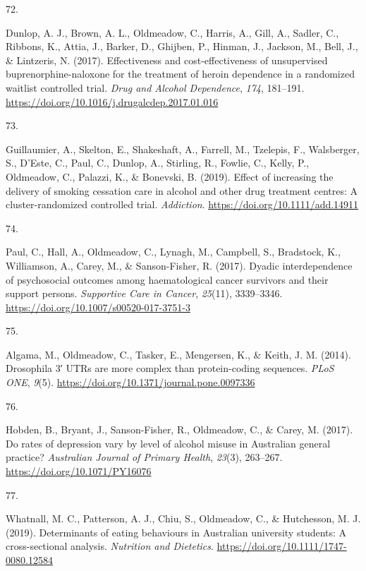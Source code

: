 \documentclass[11pt, a4paper]{awesome-cv}
\newlength{\csllabelwidth}
\newcommand{\CSLLeftMargin}[1]{\parbox[t]{\csllabelwidth}{#1}}
\newcommand{\CSLRightInline}[1]{\parbox[t]{\linewidth - \csllabelwidth}{#1}}
\begin{document}
\leavevmode\hypertarget{ref-dunlop_effectiveness_2017}{}%
\CSLLeftMargin{72. }
\CSLRightInline{Dunlop, A. J., Brown, A. L., Oldmeadow, C., Harris, A.,
Gill, A., Sadler, C., Ribbons, K., Attia, J., Barker, D., Ghijben, P.,
Hinman, J., Jackson, M., Bell, J., \& Lintzeris, N. (2017).
Effectiveness and cost-effectiveness of unsupervised
buprenorphine-naloxone for the treatment of heroin dependence in a
randomized waitlist controlled trial. \emph{Drug and Alcohol
Dependence}, \emph{174}, 181--191.
\url{https://doi.org/10.1016/j.drugalcdep.2017.01.016}}

\leavevmode\hypertarget{ref-guillaumier_effect_2019}{}%
\CSLLeftMargin{73. }
\CSLRightInline{Guillaumier, A., Skelton, E., Shakeshaft, A., Farrell,
M., Tzelepis, F., Walsberger, S., D'Este, C., Paul, C., Dunlop, A.,
Stirling, R., Fowlie, C., Kelly, P., Oldmeadow, C., Palazzi, K., \&
Bonevski, B. (2019). Effect of increasing the delivery of smoking
cessation care in alcohol and other drug treatment centres: A
cluster-randomized controlled trial. \emph{Addiction}.
\url{https://doi.org/10.1111/add.14911}}

\leavevmode\hypertarget{ref-paul_dyadic_2017}{}%
\CSLLeftMargin{74. }
\CSLRightInline{Paul, C., Hall, A., Oldmeadow, C., Lynagh, M., Campbell,
S., Bradstock, K., Williamson, A., Carey, M., \& Sanson-Fisher, R.
(2017). Dyadic interdependence of psychosocial outcomes among
haematological cancer survivors and their support persons.
\emph{Supportive Care in Cancer}, \emph{25}(11), 3339--3346.
\url{https://doi.org/10.1007/s00520-017-3751-3}}

\leavevmode\hypertarget{ref-algama_drosophila_2014}{}%
\CSLLeftMargin{75. }
\CSLRightInline{Algama, M., Oldmeadow, C., Tasker, E., Mengersen, K., \&
Keith, J. M. (2014). Drosophila 3′ UTRs are more complex than
protein-coding sequences. \emph{PLoS ONE}, \emph{9}(5).
\url{https://doi.org/10.1371/journal.pone.0097336}}

\leavevmode\hypertarget{ref-hobden_rates_2017}{}%
\CSLLeftMargin{76. }
\CSLRightInline{Hobden, B., Bryant, J., Sanson-Fisher, R., Oldmeadow,
C., \& Carey, M. (2017). Do rates of depression vary by level of alcohol
misuse in Australian general practice? \emph{Australian Journal of
Primary Health}, \emph{23}(3), 263--267.
\url{https://doi.org/10.1071/PY16076}}

\leavevmode\hypertarget{ref-whatnall_determinants_2019}{}%
\CSLLeftMargin{77. }
\CSLRightInline{Whatnall, M. C., Patterson, A. J., Chiu, S., Oldmeadow,
C., \& Hutchesson, M. J. (2019). Determinants of eating behaviours in
Australian university students: A cross-sectional analysis.
\emph{Nutrition and Dietetics}.
\url{https://doi.org/10.1111/1747-0080.12584}}
\end{document}
